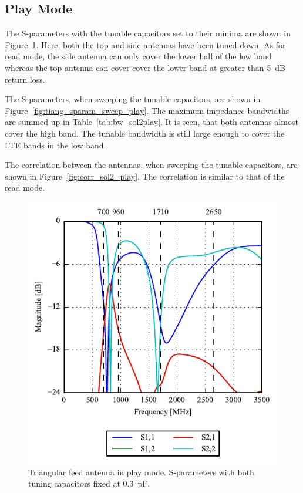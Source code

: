 \FloatBarrier
\subsection{Play Mode}

The S-parameters with the tunable capacitors set to their minima are shown in Figure~\ref{fig:triang_sparam_play}. Here, both the top and side antennas have been tuned down. As for read mode, the side antenna can only cover the lower half of the low band whereas the top antenna can cover cover the lower band at greater than \SI{5}{dB} return loss.

The S-parameters, when sweeping the tunable capacitors, are shown in Figure~\ref{fig:tiang_sparam_sweep_play}. The maximum impedance-bandwidths are summed up in Table~\ref{tab:bw_sol2play}. It is seen, that both antennas almost cover the high band. The tunable bandwidth is still large enough to cover the LTE bands in the low band.

The correlation between the antennas, when sweeping the tunable capacitors, are shown in Figure~\ref{fig:corr_sol2_play}. The correlation is similar to that of the read mode.


\begin{figure}[htbp]
    \centering
    \includegraphics{img/tech_sol/trianglefeed/play_mode/sparams.pdf}
    \caption{Triangular feed antenna in play mode. S-parameters with both tuning capacitors fixed at \SI{0.3}{pF}.}
    \label{fig:triang_sparam_play}
\end{figure}

